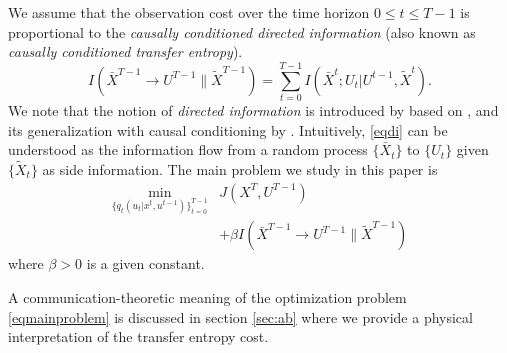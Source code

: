 We assume that the observation cost over the time horizon $0\leq t\leq T-1$ is proportional to the \emph{causally conditioned directed information} (also known as \emph{causally conditioned transfer entropy}).
\begin{equation}
\label{eqdi}
I(\bar{X}^{T-1}\rightarrow U^{T-1}\| \tilde{X}^{T-1})=\sum_{t=0}^{T-1} I(\bar{X}^t; U_t|U^{t-1},\tilde{X}^t).
\end{equation}
We note that the notion of \emph{directed information} is introduced by \cite{massey1990causality} based on \cite{marko1973bidirectional}, and its generalization with causal conditioning by \cite{kramer1998causal}. Intuitively, \eqref{eqdi} can be understood as the information flow from a random process $\{\bar{X}_t\}$ to $\{U_t\}$ given $\{\tilde{X}_t\}$ as side information.
The main problem we study in this paper is
\begin{align}
\min_{\{q_t(u_t|x^t,u^{t-1})\}_{t=0}^{T-1}} & J(X^T, U^{T-1}) \nonumber \\
&+\beta I(\bar{X}^{T-1}\rightarrow U^{T-1}\| \tilde{X}^{T-1}) \label{eqmainproblem}
\end{align}
where $\beta>0$ is a given constant.

A communication-theoretic meaning of the optimization problem \eqref{eqmainproblem} is discussed in section \ref{sec:ab} where we provide a physical interpretation of the transfer entropy cost.





